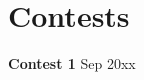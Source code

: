 \section{Contests}
\resumeSubHeadingListStart

    \resumeProjectHeading
    {\textbf{Contest 1} }    {Sep 20xx}
    \resumeItemListStart
    \resumeItemListEnd

\resumeSubHeadingListEnd
